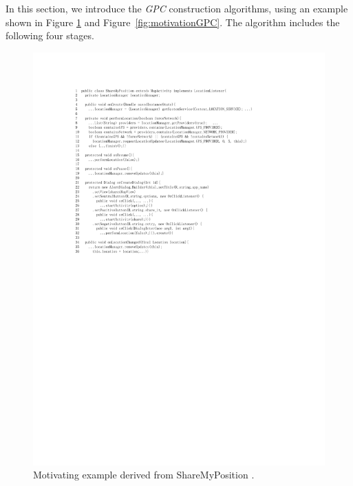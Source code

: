 In this section, we introduce the \textit{GPC} construction algorithms, using an example shown in Figure \ref{fig:1} and Figure~\ref{fig:motivationGPC}. 
The algorithm includes the following four stages. %
  \begin{figure}[!t]%
  \centering  
  \includegraphics[width=0.65\linewidth]{pic/motivation1.pdf}  
  \caption{Motivating example derived from ShareMyPosition \cite{newShareMyPosition}.}  
  \label{fig:1}  
  \end{figure} 
